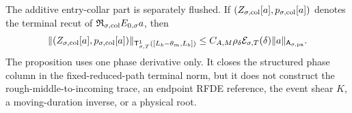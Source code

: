 \begin{proposition}
The additive entry-collar part is separately flushed.  If
\((Z_{\sigma,\rm col}[a],p_{\sigma,\rm col}[a])\) denotes the terminal
recut of
\(\mathfrak R_{\sigma,\rm col}E_{0,\sigma}a\), then
\begin{equation}
 \|(Z_{\sigma,\rm col}[a],p_{\sigma,\rm col}[a])\|_
  {\mathsf T_{\sigma,T}^1([L_b-\theta_m,L_b])}
 \le C_{A,M}\rho_\delta\mathcal E_{\sigma,T}(\delta)
       \|a\|_{\mathsf A_{\sigma,\mathrm{pa}}}.  \label{eq:terminal-phase-collar-flush}
\end{equation}
The proposition uses one phase derivative only.  It closes the structured
phase column in the fixed-reduced-path terminal norm, but it does not
construct the rough-middle-to-incoming trace, an endpoint RFDE reference,
the event shear \(K\), a moving-duration inverse, or a physical root.
\end{proposition}

